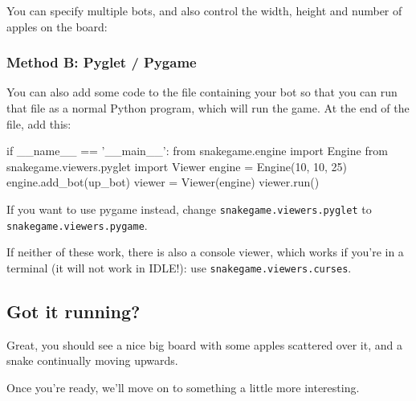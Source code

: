 You can specify multiple bots, and also control the width, height and number of
apples on the board:

\subsubsection{Method B: Pyglet / Pygame}

You can also add some code to the file containing your bot so that you can run
that file as a normal Python program, which will run the game.
At the end of the file, add this:
\begin{pythoncode}
if __name__ == '__main__':
    from snakegame.engine import Engine
    from snakegame.viewers.pyglet import Viewer
    engine = Engine(10, 10, 25)
    engine.add_bot(up_bot)
    viewer = Viewer(engine)
    viewer.run()
\end{pythoncode}

If you want to use pygame instead, change \texttt{snakegame.viewers.pyglet} to
\texttt{snakegame.viewers.pygame}.

If neither of these work, there is also a console viewer, which works if you’re
in a terminal (it will not work in IDLE!):
use \texttt{snakegame.viewers.curses}.

\subsection{Got it running?}

Great, you should see a nice big board with some apples scattered over it,
and a snake continually moving upwards.

Once you’re ready, we’ll move on to something a little more interesting.


